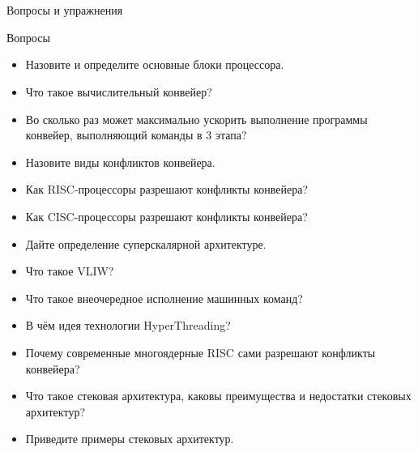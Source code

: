 \documentclass[xetex,aspectratio=43]{beamer}
\begin{document}
\section*{}

\begin{frame}{Вопросы и упражнения}
\begin{block}{Вопросы}
\begin{itemize}
\tightlist
\item Назовите и определите основные блоки процессора.
\item Что такое вычислительный конвейер?
\item Во сколько раз может максимально ускорить выполнение программы конвейер, выполняющий команды в 3 этапа?
\item Назовите виды конфликтов конвейера.
\item Как RISC-процессоры разрешают конфликты конвейера?
\item Как CISC-процессоры разрешают конфликты конвейера?
\item Дайте определение суперскалярной архитектуре.
\item Что такое VLIW?
\item Что такое внеочередное исполнение машинных команд?
\item В чём идея технологии HyperThreading?
\item Почему современные многоядерные RISC сами разрешают конфликты конвейера?
\item Что такое стековая архитектура, каковы преимущества и недостатки стековых архитектур?
\item Приведите примеры стековых архитектур.
\end{itemize}
\end{block}
\end{frame}

\postamble
\end{document}
